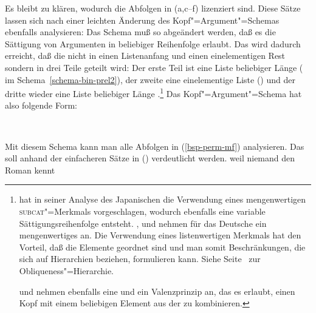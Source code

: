 Es bleibt zu klären, wodurch die Abfolgen in (a,c--f) lizenziert sind. Diese
Sätze lassen sich nach einer leichten Änderung des Kopf"=Argument"=Schemas ebenfalls
analysieren: Das Schema muß so abgeändert werden, daß es die Sättigung von Argumenten
in beliebiger Reihenfolge erlaubt. Das wird dadurch erreicht, daß die \subcatl nicht
in einen Listenanfang und einen einelementigen Rest sondern in drei Teile geteilt wird: Der erste
Teil ist eine Liste beliebiger Länge (\, im Schema~\ref{schema-bin-prel2}), der zweite eine einelementige Liste () und der dritte wieder eine
Liste beliebiger Länge .\footnote{
  \citet{Gunji86a} hat in seiner Analyse des Japanischen die Verwendung eines
  mengenwertigen \textsc{subcat}"=Merkmals vorgeschlagen, wodurch ebenfalls eine variable Sättigungsreihenfolge
  entsteht. \citet{HN89a}, \citet{Pollard90a} und \citet*{EEU92a} nehmen für das Deutsche
  ein mengenwertiges \subcatm an. Die Verwendung eines listenwertigen Merkmals hat den
  Vorteil, daß die Elemente geordnet sind und man somit Beschränkungen, die sich auf
  Hierarchien beziehen, formulieren kann. Siehe Seite~\pageref{page-obliquen-h} zur Obliqueness"=Hierarchie. %

  \citet[]{FR92} und \citet[--223]{Kiss95b} nehmen ebenfalls eine \subcatl und ein Valenzprinzip an, das es erlaubt,
  einen Kopf mit einem beliebigen Element aus der \subcatl zu kombinieren.%
}
Das Kopf"=Argument"=Schema hat also folgende Form:
\begin{samepage}
\begin{schema}
\label{schema-bin-prel2}
 \impl\\
\end{schema}
\end{samepage}
Mit diesem Schema kann man alle Abfolgen in (\ref{bsp-perm-mf}) analysieren. Das soll
anhand der einfacheren Sätze in () verdeutlicht werden.
\eal
\ex weil niemand den Roman kennt
